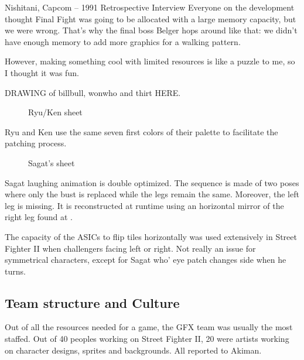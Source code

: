 \begin{q}{Nishitani, Capcom – 1991 Retrospective Interview}
Everyone on the development thought Final Fight was going to be allocated with a large memory capacity, but we were wrong.
That's why the final boss Belger hops around like that: we didn't have enough memory to add more graphics for a walking pattern. 

However, making something cool with limited resources is like a puzzle to me, so I thought it was fun. 
\end{q}

DRAWING of billbull, wonwho and thirt HERE.

 \begin{figure}[H]
\caption*{Ryu/Ken sheet}
\end{figure}

Ryu and Ken use the same seven first colors of their palette to facilitate the patching process. 






 \begin{figure}[H]
\caption*{Sagat's sheet}
\end{figure}

Sagat laughing animation is double optimized. The sequence is made of two poses where only the bust is replaced while the legs remain the same. Moreover, the left leg is missing. It is reconstructed at runtime using an horizontal mirror of the right leg found at .

\begin{trivia}
The capacity of the ASICs to flip tiles horizontally was used extensively in Street Fighter II when challengers facing left or right. Not really an issue for symmetrical characters, except for Sagat who' eye patch changes side when he turns.
\end{trivia}

\pagebreak

\subsection{Team structure and Culture}

Out of all the resources needed for a game, the GFX team was usually the most staffed. Out of 40 peoples working on Street Fighter II, 20 were artists working on character designs, sprites and backgrounds. All reported to Akiman\cite{sf2_oral_history}.

